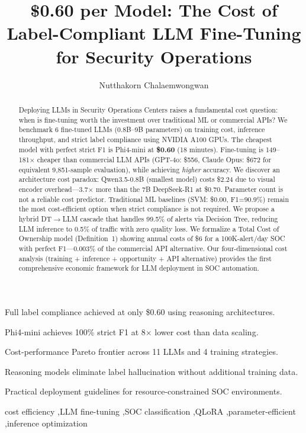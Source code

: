 \documentclass[review,3p]{elsarticle}
\begin{document}
\begin{frontmatter}

\title{\$0.60 per Model: The Cost of Label-Compliant LLM Fine-Tuning for Security Operations}

\author[kmitl]{Nutthakorn Chalaemwongwan}
\address[kmitl]{Department of Computer Engineering, KOSEN-KMITL, King Mongkut's Institute of Technology Ladkrabang, Bangkok, Thailand}

\begin{highlights}
\item Full label compliance achieved at only \$0.60 using reasoning architectures.
\item Phi4-mini achieves 100\% strict F1 at 8$\times$ lower cost than data scaling.
\item Cost-performance Pareto frontier across 11 LLMs and 4 training strategies.
\item Reasoning models eliminate label hallucination without additional training data.
\item Practical deployment guidelines for resource-constrained SOC environments.
\end{highlights}

\begin{abstract}
Deploying LLMs in Security Operations Centers raises a fundamental cost question: when is fine-tuning worth the investment over traditional ML or commercial APIs? We benchmark 6 fine-tuned LLMs (0.8B--9B parameters) on training cost, inference throughput, and strict label compliance using NVIDIA A100 GPUs. The cheapest model with perfect strict F1 is Phi4-mini at \textbf{\$0.60} (18 minutes). Fine-tuning is 149--181$\times$ cheaper than commercial LLM APIs (GPT-4o: \$556, Claude Opus: \$672 for equivalent 9,851-sample evaluation), while achieving \emph{higher} accuracy. We discover an architecture cost paradox: Qwen3.5-0.8B (smallest model) costs \$2.24 due to visual encoder overhead---3.7$\times$ more than the 7B DeepSeek-R1 at \$0.70. Parameter count is not a reliable cost predictor. Traditional ML baselines (SVM: \$0.00, F1=90.9\%) remain the most cost-efficient option when strict compliance is not required. We propose a hybrid DT$\to$LLM cascade that handles 99.5\% of alerts via Decision Tree, reducing LLM inference to 0.5\% of traffic with zero quality loss. We formalize a Total Cost of Ownership model (Definition~1) showing annual costs of \$6 for a 100K-alert/day SOC with perfect F1---0.003\% of the commercial API alternative. Our four-dimensional cost analysis (training + inference + opportunity + API alternative) provides the first comprehensive economic framework for LLM deployment in SOC automation.
\end{abstract}

\begin{keyword}
cost efficiency \sep LLM fine-tuning \sep SOC classification \sep QLoRA \sep parameter-efficient \sep inference optimization
\end{keyword}

\end{frontmatter}
\end{document}
